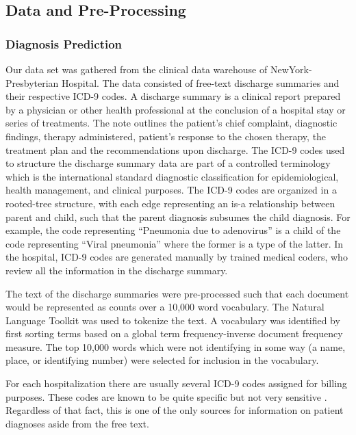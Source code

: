 \documentclass{article}
\begin{document}
\subsection{Data and Pre-Processing}


\subsubsection{Diagnosis Prediction}

Our data set was gathered from the clinical data warehouse of NewYork-Presbyterian
Hospital. The data consisted of free-text discharge summaries and
their respective ICD-9 codes. A discharge summary is a clinical report
prepared by a physician or other health professional at the conclusion
of a hospital stay or series of treatments. The note outlines the
patient's chief complaint, diagnostic findings, therapy administered,
patient's response to the chosen therapy, the treatment plan and the
recommendations upon discharge. The ICD-9 codes used to structure
the discharge summary data are part of a controlled terminology which
is the international standard diagnostic classification for epidemiological,
health management, and clinical purposes. The ICD-9 codes are organized
in a rooted-tree structure, with each edge representing an is-a relationship
between parent and child, such that the parent diagnosis subsumes
the child diagnosis. For example, the code representing {}``Pneumonia
due to adenovirus'' is a child of the code representing {}``Viral
pneumonia'' where the former is a type of the latter. In the hospital,
ICD-9 codes are generated manually by trained medical coders, who
review all the information in the discharge summary.

The text of the discharge summaries were pre-processed such that each
document would be represented as counts over a 10,000 word vocabulary.
The Natural Language Toolkit was used to tokenize the text. A vocabulary
was identified by first sorting terms based on a global term frequency-inverse
document frequency measure. The top 10,000 words which were not identifying
in some way (a name, place, or identifying number) were selected for
inclusion in the vocabulary.

For each hospitalization there are usually several ICD-9 codes assigned
for billing purposes. These codes are known to be quite specific but
not very sensitive \citep{Birmetal2005}. Regardless of that fact,
this is one of the only sources for information on patient diagnoses
aside from the free text. %
\end{document}
